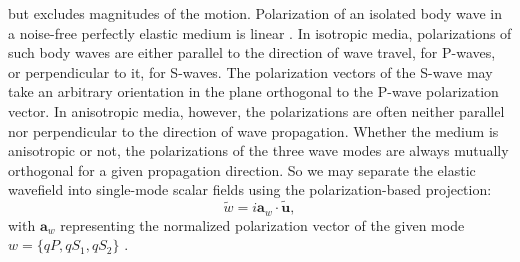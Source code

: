 but excludes magnitudes of the motion.
Polarization of an isolated body wave in a noise-free perfectly elastic medium is linear \mbox{\cite[]{winterstein:1990}}.
In isotropic media, polarizations of such body waves are either parallel to the direction of wave travel, for P-waves,
or perpendicular to it, for S-waves. The polarization vectors of the S-wave may take an arbitrary orientation in the 
plane orthogonal to the P-wave polarization vector.
In anisotropic media, however, the polarizations are often neither parallel nor
perpendicular to the direction of wave propagation.
Whether the medium is anisotropic or not, the polarizations of the three wave modes are always mutually orthogonal for a given propagation direction.
So we may separate the elastic wavefield into single-mode scalar fields using the polarization-based projection:
\begin{equation}
\label{eq:sep}
\widetilde{w}=i\mathbf{a}_w\cdot\widetilde{\mathbf{u}},
\end{equation}
with $\mathbf{a}_w$ representing the normalized polarization vector of the given mode
$w=\{qP, qS_1, qS_2\}$ \cite[]{dellinger.thesis}.

